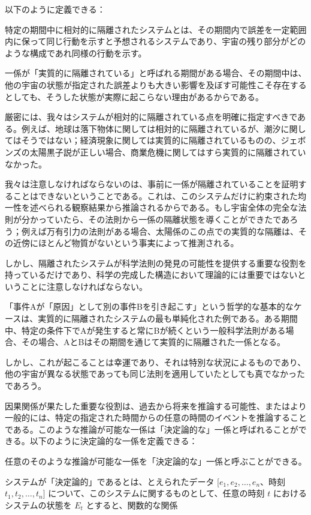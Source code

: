 \documentclass[a4paper,11pt,openany]{ltjsbook}
\begin{document}
以下のように定義できる：

特定の期間中に相対的に隔離されたシステムとは、その期間内で誤差を一定範囲内に保って同じ行動を示すと予想されるシステムであり、宇宙の残り部分がどのような構成であれ同様の行動を示す。

一係が「実質的に隔離されている」と呼ばれる期間がある場合、その期間中は、他の宇宙の状態が指定された誤差よりも大きい影響を及ぼす可能性こそ存在するとしても、そうした状態が実際に起こらない理由があるからである。

厳密には、我々はシステムが相対的に隔離されている点を明確に指定すべきである。例えば、地球は落下物体に関しては相対的に隔離されているが、潮汐に関してはそうではない；経済現象に関しては実質的に隔離されているものの、ジェボンズの太陽黒子説が正しい場合、商業危機に関してはすら実質的に隔離されていなかった。

我々は注意しなければならないのは、事前に一係が隔離されていることを証明することはできないということである。これは、このシステムだけに約束された均一性を述べられる観察結果から推論されるからである。もし宇宙全体の完全な法則が分かっていたら、その法則から一係の隔離状態を導くことができたであろう；例えば万有引力の法則がある場合、太陽係のこの点での実質的な隔離は、その近傍にほとんど物質がないという事実によって推測される。

しかし、隔離されたシステムが科学法則の発見の可能性を提供する重要な役割を持っているだけであり、科学の完成した構造において理論的には重要ではないということに注意しなければならない。

「事件Aが「原因」として別の事件Bを引き起こす」という哲学的な基本的なケースは、実質的に隔離されたシステムの最も単純化された例である。ある期間中、特定の条件下でAが発生すると常にBが続くという一般科学法則がある場合、その場合、AとBはその期間を通じて実質的に隔離された一係となる。

しかし、これが起こることは幸運であり、それは特別な状況によるものであり、他の宇宙が異なる状態であっても同じ法則を適用していたとしても真でなかったであろう。

因果関係が果たした重要な役割は、過去から将来を推論する可能性、またはより一般的には、特定の指定された時間からの任意の時間のイベントを推論することである。このような推論が可能な一係は「決定論的な」一係と呼ばれることができる。以下のように決定論的な一係を定義できる：

任意のそのような推論が可能な一係を「決定論的な」一係と呼ぶことができる。

システムが「決定論的」であるとは、とえられたデータ
[$e_1, e_2, \dots, e_n$、時刻 $t_1, t_2, \dots, t_n$] について、このシステムに関するものとして、任意の時刻 $t$ におけるシステムの状態を $E_t$ とすると、関数的な関係
\end{document}
